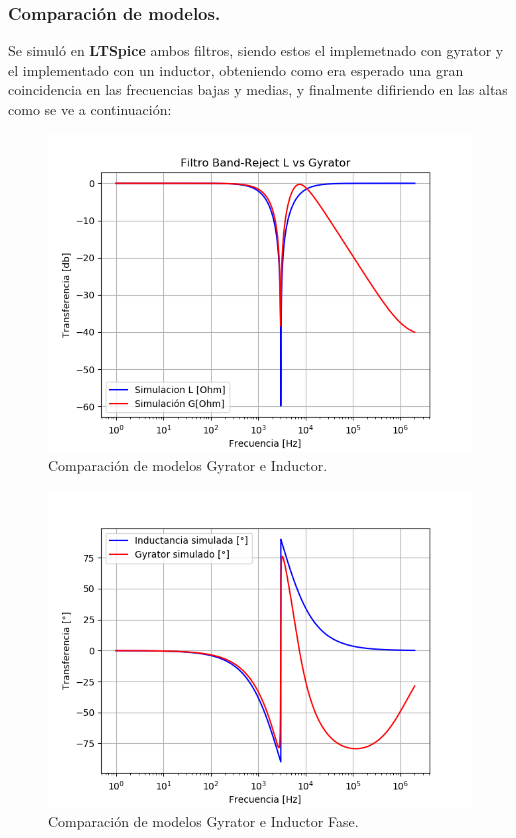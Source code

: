 \documentclass[a4paper]{article}
\begin{document}
\subsubsection{Comparación de modelos.}
Se simuló en \textbf{LTSpice} ambos filtros, siendo estos el implemetnado con gyrator y el implementado con un inductor, obteniendo como era esperado una gran coincidencia en las frecuencias bajas y medias, y finalmente difiriendo en las altas como se ve a continuación:
\begin{figure}[H]	
	\centering
	\includegraphics[width=\textwidth]{ImagenesEj2/simBR.PNG}
	\caption{Comparación de modelos Gyrator e Inductor.}
	\label{fig:gyrIndBR}
\end{figure}
\begin{figure}[H]	
	\centering
	\includegraphics[width=\textwidth]{ImagenesEj2/simBRP.PNG}
	\caption{Comparación de modelos Gyrator e Inductor Fase.}
	\label{fig:gyrIndPBR}
\end{figure}
\end{document}
